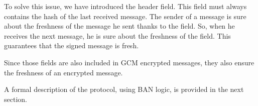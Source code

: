 To solve this issue, we have introduced the  header field. This
field must always contains the hash of the last received message. The sender of
a message is sure about the freshness of the message he sent thanks to the
 field. So, when he receives the next message, he is sure about the
freshness of the  field. This guarantees that the signed
message is fresh.

Since those fields are also included in GCM encrypted messages, they also ensure
the freshness of an encrypted message.

A formal description of the protocol, using BAN logic, is provided in the next
section.
